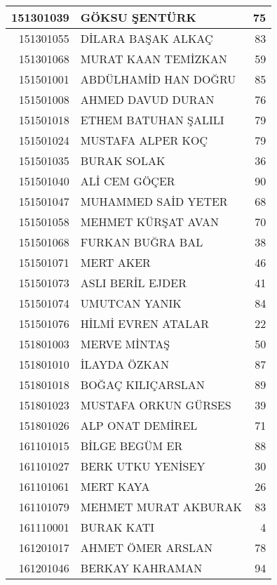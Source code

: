 \documentclass[12pt]{article}
\begin{document}
\begin{multicols}{2}
\begin{longtable}{||r||l||r||}
    \midrule
    151301039 & GÖKSU ŞENTÜRK & 75 \\
    \midrule
    151301055 & DİLARA BAŞAK ALKAÇ & 83 \\
    \midrule
    151301068 & MURAT KAAN TEMİZKAN & 59 \\
    \midrule
    151501001 & ABDÜLHAMİD HAN DOĞRU & 85 \\
    \midrule
    151501008 & AHMED DAVUD DURAN & 76 \\
    \midrule
    151501018 & ETHEM BATUHAN ŞALILI & \cellcolor[rgb]{ 1,  1,  0} 79 \\
    \midrule
    151501024 & MUSTAFA ALPER KOÇ & 79 \\
    \midrule
    151501035 & BURAK SOLAK & 36 \\
    \midrule
    151501040 & ALİ CEM GÖÇER & 90 \\
    \midrule
    151501047 & MUHAMMED SAİD YETER & 68 \\
    \midrule
    151501058 & MEHMET KÜRŞAT AVAN & 70 \\
    \midrule
    151501068 & FURKAN BUĞRA BAL & 38 \\
    \midrule
    151501071 & MERT AKER & 46 \\
    \midrule
    151501073 & ASLI BERİL EJDER & 41 \\
    \midrule
    151501074 & UMUTCAN YANIK & 84 \\
    \midrule
    151501076 & HİLMİ EVREN ATALAR & 22 \\
    \midrule
    151801003 & MERVE MİNTAŞ & 50 \\
    \midrule
    151801010 & İLAYDA ÖZKAN & 87 \\
    \midrule
    151801018 & BOĞAÇ KILIÇARSLAN & 89 \\
    \midrule
    151801023 & MUSTAFA ORKUN GÜRSES & 39 \\
    \midrule
    151801026 & ALP ONAT DEMİREL & 71 \\
    \midrule
    161101015 & BİLGE BEGÜM ER & 88 \\
    \midrule
    161101027 & BERK UTKU YENİSEY & 30 \\
    \midrule
    161101061 & MERT KAYA & 26 \\
    \midrule
    161101079 & MEHMET MURAT AKBURAK & 83 \\
    \midrule
    161110001 & BURAK KATI & 4 \\
    \midrule
    161201017 & AHMET ÖMER ARSLAN & \cellcolor[rgb]{ 1,  1,  0} 78 \\
    \midrule
    161201046 & BERKAY KAHRAMAN & 94 \\

\end{longtable}
\end{multicols}
\end{document}
